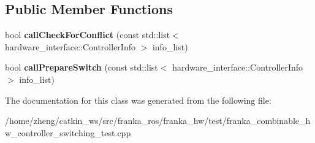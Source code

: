 \subsection*{Public Member Functions}
\begin{DoxyCompactItemize}
\item 
\mbox{\label{class_combinable_controller_conflict_a86b146319e48d003605d8a04ed618b7b}} 
bool {\bfseries call\+Check\+For\+Conflict} (const std\+::list$<$ hardware\+\_\+interface\+::\+Controller\+Info $>$ info\+\_\+list)
\item 
\mbox{\label{class_combinable_controller_conflict_a1bca3dab20d7f42cd928fd8db61ea63d}} 
bool {\bfseries call\+Prepare\+Switch} (const std\+::list$<$ hardware\+\_\+interface\+::\+Controller\+Info $>$ info\+\_\+list)
\end{DoxyCompactItemize}


The documentation for this class was generated from the following file\+:\begin{DoxyCompactItemize}
\item 
/home/zheng/catkin\+\_\+ws/src/franka\+\_\+ros/franka\+\_\+hw/test/franka\+\_\+combinable\+\_\+hw\+\_\+controller\+\_\+switching\+\_\+test.\+cpp\end{DoxyCompactItemize}
